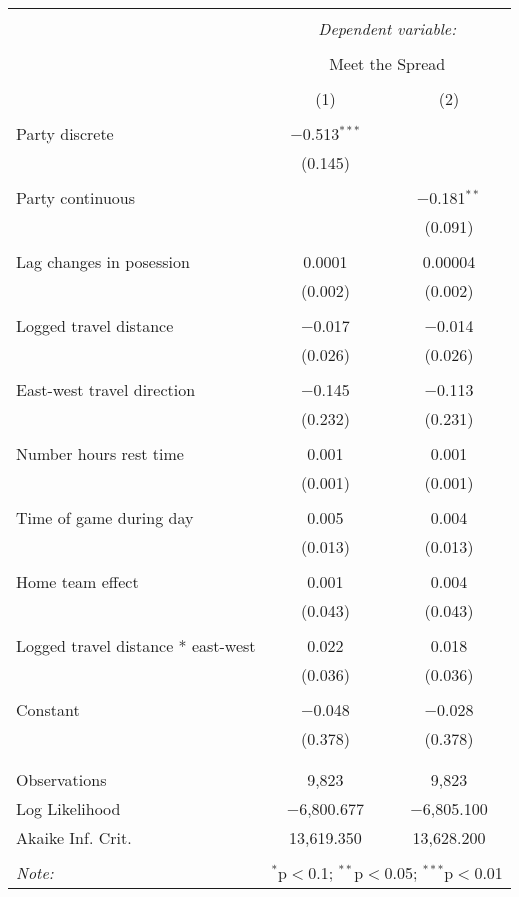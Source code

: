 \documentclass[letterpaper,12pt]{article}
\begin{document}
\begin{tabular}{@{\extracolsep{5pt}}lcc}  \\[-1.8ex]\hline  \hline \\[-1.8ex]   & \multicolumn{2}{c}{\textit{Dependent variable:}} \\  \cline{2-3}  \\[-1.8ex] & \multicolumn{2}{c}{Meet the Spread} \\  \\[-1.8ex] & (1) & (2)\\  \hline \\[-1.8ex]   Party discrete & $-$0.513$^{***}$ &  \\    & (0.145) &  \\    & & \\   Party continuous &  & $-$0.181$^{**}$ \\    &  & (0.091) \\    & & \\   Lag changes in posession & 0.0001 & 0.00004 \\    & (0.002) & (0.002) \\    & & \\   Logged travel distance & $-$0.017 & $-$0.014 \\    & (0.026) & (0.026) \\    & & \\   East-west travel direction & $-$0.145 & $-$0.113 \\    & (0.232) & (0.231) \\    & & \\   Number hours rest time & 0.001 & 0.001 \\    & (0.001) & (0.001) \\    & & \\   Time of game during day & 0.005 & 0.004 \\    & (0.013) & (0.013) \\    & & \\   Home team effect & 0.001 & 0.004 \\    & (0.043) & (0.043) \\    & & \\   Logged travel distance * east-west & 0.022 & 0.018 \\    & (0.036) & (0.036) \\    & & \\   Constant & $-$0.048 & $-$0.028 \\    & (0.378) & (0.378) \\    & & \\  \hline \\[-1.8ex]  Observations & 9,823 & 9,823 \\  Log Likelihood & $-$6,800.677 & $-$6,805.100 \\  Akaike Inf. Crit. & 13,619.350 & 13,628.200 \\  \hline  \hline \\[-1.8ex]  \textit{Note:}  & \multicolumn{2}{r}{$^{*}$p$<$0.1; $^{**}$p$<$0.05; $^{***}$p$<$0.01} \\  \end{tabular}  
\end{document}
